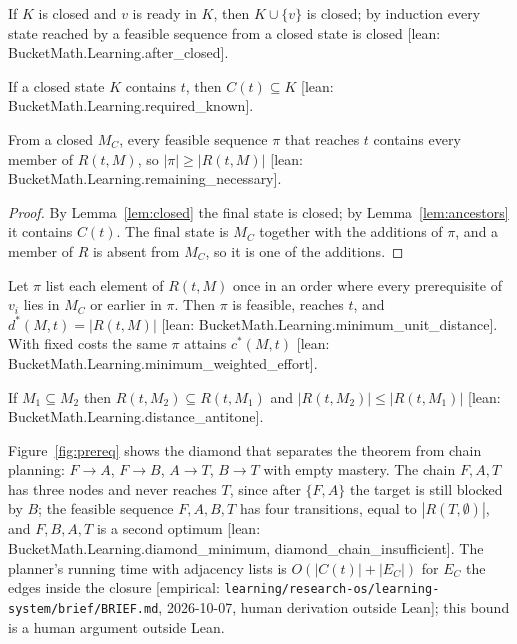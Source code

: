 \documentclass[11pt]{article}
\newcommand{\emp}[1]{\textcolor{bucketgray}{\footnotesize [empirical: #1]}}
\newcommand{\bm}[1]{\textcolor{bucketgray}{\footnotesize [lean: #1]}}
\newcommand{\brief}{\emp{\texttt{learning/\allowbreak research-os/\allowbreak learning-system/\allowbreak brief/\allowbreak BRIEF.\allowbreak md}, 2026-10-07, human derivation outside Lean}}
\begin{document}
\begin{lemma}
\label{lem:closed}
If $K$ is closed and $v$ is ready in $K$, then $K \cup \{v\}$ is closed; by induction every state reached by a feasible sequence from a closed state is closed \bm{BucketMath.Learning.after\_closed}.
\end{lemma}

\begin{lemma}
\label{lem:ancestors}
If a closed state $K$ contains $t$, then $C(t) \subseteq K$ \bm{BucketMath.Learning.required\_known}.
\end{lemma}

\begin{theorem}
\label{thm:necessary}
From a closed $M_C$, every feasible sequence $\pi$ that reaches $t$ contains every member of $R(t, M)$, so $|\pi| \geq |R(t, M)|$ \bm{BucketMath.Learning.remaining\_necessary}.
\end{theorem}

\begin{proof}
By Lemma~\ref{lem:closed} the final state is closed; by Lemma~\ref{lem:ancestors} it contains $C(t)$. The final state is $M_C$ together with the additions of $\pi$, and a member of $R$ is absent from $M_C$, so it is one of the additions.
\end{proof}

\begin{theorem}
\label{thm:minimum}
Let $\pi$ list each element of $R(t, M)$ once in an order where every prerequisite of $v_i$ lies in $M_C$ or earlier in $\pi$. Then $\pi$ is feasible, reaches $t$, and $d^*(M, t) = |R(t, M)|$ \bm{BucketMath.Learning.minimum\_unit\_distance}. With fixed costs the same $\pi$ attains $c^*(M, t)$ \bm{BucketMath.Learning.minimum\_weighted\_effort}.
\end{theorem}

\begin{corollary}
\label{cor:antitone}
If $M_1 \subseteq M_2$ then $R(t, M_2) \subseteq R(t, M_1)$ and $|R(t, M_2)| \leq |R(t, M_1)|$ \bm{BucketMath.Learning.distance\_antitone}.
\end{corollary}

Figure~\ref{fig:prereq} shows the diamond that separates the theorem from chain planning: $F \to A$, $F \to B$, $A \to T$, $B \to T$ with empty mastery. The chain $F, A, T$ has three nodes and never reaches $T$, since after $\{F, A\}$ the target is still blocked by $B$; the feasible sequence $F, A, B, T$ has four transitions, equal to $|R(T, \emptyset)|$, and $F, B, A, T$ is a second optimum \bm{BucketMath.Learning.diamond\_minimum, diamond\_chain\_insufficient}. The planner's running time with adjacency lists is $O(|C(t)| + |E_C|)$ for $E_C$ the edges inside the closure \brief; this bound is a human argument outside Lean.
\end{document}
